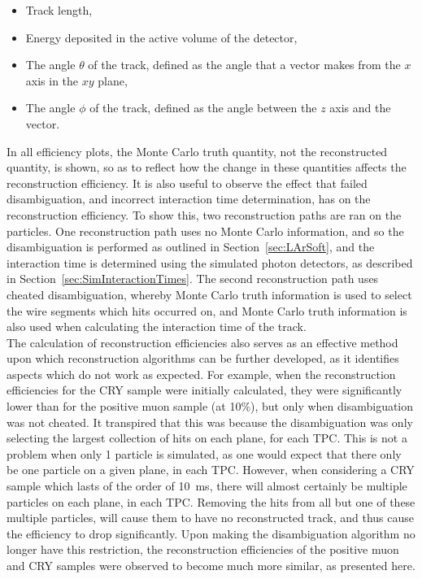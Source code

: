 \begin{itemize}
\item Track length,
\item Energy deposited in the active volume of the detector,
\item The angle $\theta$ of the track, defined as the angle that a vector makes from the $x$ axis in the $xy$ plane,
\item The angle $\phi$ of the track, defined as the angle between the $z$ axis and the vector.
\end{itemize}
In all efficiency plots, the Monte Carlo truth quantity, not the reconstructed quantity, is shown, so as to reflect how the change in these quantities affects the reconstruction efficiency. It is also useful to observe the effect that failed disambiguation, and incorrect interaction time determination, has on the reconstruction efficiency. To show this, two reconstruction paths are ran on the particles. One reconstruction path uses no Monte Carlo information, and so the disambiguation is performed as outlined in Section~\ref{sec:LArSoft}, and the interaction time is determined using the simulated photon detectors, as described in Section~\ref{sec:SimInteractionTimes}. The second reconstruction path uses cheated disambiguation, whereby Monte Carlo truth information is used to select the wire segments which hits occurred on, and Monte Carlo truth information is also used when calculating the interaction time of the track. \\

The calculation of reconstruction efficiencies also serves as an effective method upon which reconstruction algorithms can be further developed, as it identifies aspects which do not work as expected. For example, when the reconstruction efficiencies for the CRY sample were initially calculated, they were significantly lower than for the positive muon sample (at 10\%), but only when disambiguation was not cheated. It transpired that this was because the disambiguation was only selecting the largest collection of hits on each plane, for each TPC. This is not a problem when only 1 particle is simulated, as one would expect that there only be one particle on a given plane, in each TPC. However, when considering a CRY sample which lasts of the order of 10~ms, there will almost certainly be multiple particles on each plane, in each TPC. Removing the hits from all but one of these multiple particles, will cause them to have no reconstructed track, and thus cause the efficiency to drop significantly. Upon making the disambiguation algorithm no longer have this restriction, the reconstruction efficiencies of the positive muon and CRY samples were observed to become much more similar, as presented here. \\

